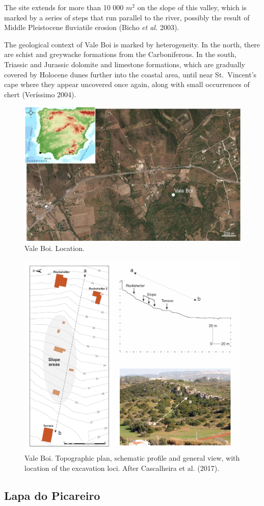 \documentclass[12pt,twoside]{reedthesis}
\begin{document}
The site extends for more than 10 000 \(m^2\) on the slope of this valley, which is marked by a series of steps that run parallel to the river, possibly the result of Middle Pleistocene fluviatile erosion (Bicho \emph{et al.} 2003).

The geological context of Vale Boi is marked by heterogeneity. In the north, there are schist and greywacke formations from the Carboniferous. In the south, Triassic and Jurassic dolomite and limestone formations, which are gradually covered by Holocene dunes further into the coastal area, until near St.~Vincent's cape where they appear uncovered once again, along with small occurrences of chert (Veríssimo 2004).
\begin{figure}

{\centering \includegraphics[width=0.6\linewidth]{figure/vale_boi_map} 

}

\caption{Vale Boi. Location.}\label{fig:vbmap}
\end{figure}
\begin{figure}

{\centering \includegraphics[width=0.6\linewidth]{figure/vb_plan} 

}

\caption{Vale Boi. Topographic plan, schematic profile and general view, with location of the excavation loci. After Cascalheira et al. (2017).}\label{fig:vbphoto}
\end{figure}
\hypertarget{lapa-do-picareiro}{%
\subsection{Lapa do Picareiro}\label{lapa-do-picareiro}}
\end{document}
